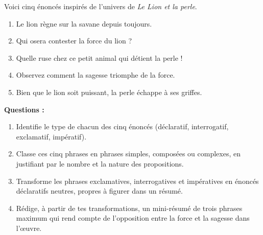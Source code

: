 \documentclass[11pt]{article}
\begin{document}
\begin{exercice}
Voici cinq énoncés inspirés de l'univers de \emph{Le Lion et la perle}.
\begin{enumerate}
\item Le lion règne sur la savane depuis toujours.
\item Qui osera contester la force du lion ?
\item Quelle ruse chez ce petit animal qui détient la perle !
\item Observez comment la sagesse triomphe de la force.
\item Bien que le lion soit puissant, la perle échappe à ses griffes.
\end{enumerate}
\textbf{Questions :}
\begin{enumerate}
\item Identifie le type de chacun des cinq énoncés (déclaratif, interrogatif, exclamatif, impératif).
\item Classe ces cinq phrases en phrases simples, composées ou complexes, en justifiant par le nombre et la nature des propositions.
\item Transforme les phrases exclamatives, interrogatives et impératives en énoncés déclaratifs neutres, propres à figurer dans un résumé.
\item Rédige, à partir de tes transformations, un mini-résumé de trois phrases maximum qui rend compte de l'opposition entre la force et la sagesse dans l'œuvre.
\end{enumerate}
\end{exercice}
\end{document}
